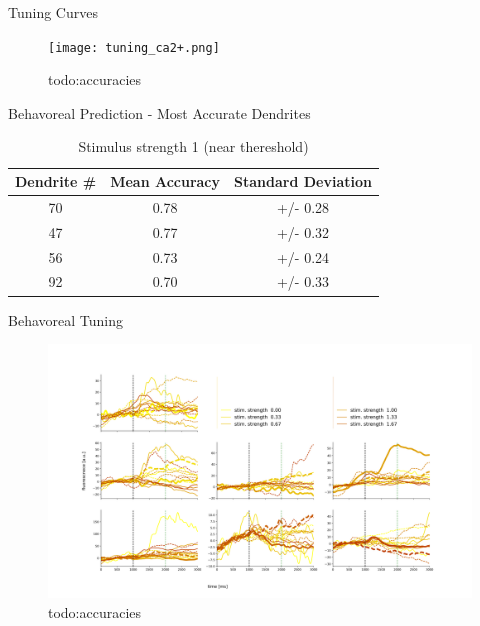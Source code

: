 \documentclass[10pt]{beamer}
\begin{document}
\begin{frame}[fragile]{Tuning Curves}
\begin{center}
	\begin{figure}
      \texttt{[image: tuning\_ca2+.png]}
      \caption*{todo:accuracies}
	\end{figure}
	\end{center}
\end{frame}

\begin{frame}[fragile]{Behavoreal Prediction - Most Accurate Dendrites}
\begin{table}
    \caption*{Stimulus strength 1 (near thereshold)}
    \begin{tabular}{c|c|c}
      \toprule
      Dendrite \# & Mean Accuracy & Standard Deviation\\
      \midrule
      70 & 0.78 & +/- 0.28\\
      47 & 0.77 & +/- 0.32\\
      56 & 0.73 & +/- 0.24\\
      92 & 0.70 & +/- 0.33\\
      \bottomrule
    \end{tabular}
  \end{table}
\end{frame}

\begin{frame}[fragile]{Behavoreal Tuning}
\begin{center}
	\begin{figure}
      \includegraphics[width=1.0\textwidth]{tuning_ca2+_bb.png}
      \caption*{todo:accuracies}
	\end{figure}
	\end{center}
\end{frame}
\end{document}
